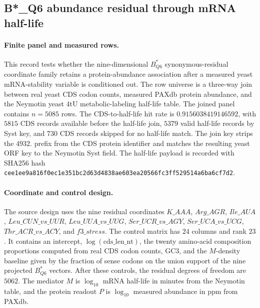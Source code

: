 \subsection{B*\_Q6 abundance residual through mRNA half-life}
\label{sec:bioreality-q6-mrna-stability-mediation-abundance-residual}

\paragraph{Finite panel and measured rows.}
This record tests whether the nine-dimensional $B^{*}_{Q6}$ synonymous-residual coordinate family retains a protein-abundance association after a measured yeast mRNA-stability variable is conditioned out. The row universe is a three-way join between real yeast CDS codon counts, measured PAXdb protein abundance, and the Neymotin yeast 4tU metabolic-labeling half-life table. The joined panel contains $n=5085$ rows. The CDS-to-half-life hit rate is $0.9156038419146592$, with $5815$ CDS records available before the half-life join, $5379$ valid half-life records by Syst key, and $730$ CDS records skipped for no half-life match. The join key strips the $4932.$ prefix from the CDS protein identifier and matches the resulting yeast ORF key to the Neymotin Syst field. The half-life payload is recorded with SHA256 hash \texttt{cee1ee9a816f0ec1e351bc2d63d4838ae603ea20566fc3ff529514a6ba6cf7d2}.

\paragraph{Coordinate and control design.}
The source design uses the nine residual coordinates $K\_AAA$, $Arg\_AGR$, $Ile\_AUA$, $Leu\_CUN\_vs\_UUR$, $Leu\_UUA\_vs\_UUG$, $Ser\_UCR\_vs\_AGY$, $Ser\_UCA\_vs\_UCG$, $Thr\_ACR\_vs\_ACY$, and $f3\_stress$. The control matrix has $24$ columns and rank $23$. It contains an intercept, $\log(\mathrm{cds\_len\_nt})$, the twenty amino-acid composition proportions computed from real CDS codon counts, GC3, and the $M$-density baseline given by the fraction of sense codons on the union support of the nine projected $B^{*}_{Q6}$ vectors. After these controls, the residual degrees of freedom are $5062$. The mediator $M$ is $\log_{10}$ mRNA half-life in minutes from the Neymotin table, and the protein readout $P$ is $\log_{10}$ measured abundance in ppm from PAXdb.

